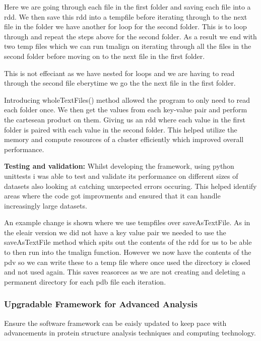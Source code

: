 \documentclass[]{final_report}
\begin{document}
Here we are going through each file in the first folder and saving each file into a rdd. We then save this rdd into a tempfile before iterating through to the next file in the folder we have another for loop for the second folder. This is to loop through and repeat the steps above for the second folder. As a result we end with two temp files which we can run tmalign on iterating through all the files in the second folder before moving on to the next file in the first folder.

This is not effeciant as we have nested for loops and we are having to read through the second file eberytime we go the the next file in the first folder.

Introducing wholeTextFiles() method allowed the program to only need to read each folder once. We then get the values from each key-value pair and perform the cartesean product on them. Giving us an rdd where each value in the first folder is paired with each value in the second folder. This helped utilize the memory and compute resources of a cluster efficiently which improved overall performance.

\clearpage

\textbf{Testing and validation:} Whilst developing the framework, using python unittests i was able to test and validate its performance on different sizes of datasets also looking at catching unxepected errors occuring. This helped identify areas where the code got improvments and ensured that it can handle increasingly large datasets.

An example change is shown where we use tempfiles over saveAsTextFile. As in the eleair version we did not have a key value pair we needed to use the saveAsTextFile method which spits out the contents of the rdd for us to be able to then run into the tmalign function. However we now have the contents of the pdv so we can write these to a temp file where once used the directory is closed and not used again. This saves reasorces as we are not creating and deleting a permanent directory for each pdb file each iteration.

\clearpage

\subsubsection{Upgradable Framework for Advanced Analysis}
\begin{displayquote}
    Ensure the software framework can be eaisly updated to keep pace with advancements
    in protein structure analysis techniques and computing technology.
\end{displayquote}
\end{document}
